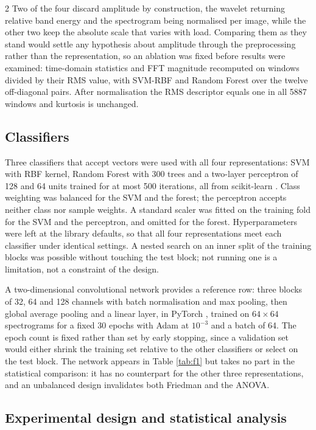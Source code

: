 \documentclass[12pt,twoside,titlepage]{ingenius}
\begin{document}
\begin{multicols}{2}
Two of the four discard amplitude by construction, the wavelet returning
relative band energy and the spectrogram being normalised per image, while the
other two keep the absolute scale that varies with load. Comparing them as they
stand would settle any hypothesis about amplitude through the preprocessing
rather than the representation, so an ablation was fixed before results were
examined: time-domain statistics and FFT magnitude recomputed on windows divided
by their RMS value, with SVM-RBF and Random Forest over the twelve off-diagonal
pairs. After normalisation the RMS descriptor equals one in all 5887 windows and
kurtosis is unchanged.

\subsection{Classifiers}

Three classifiers that accept vectors were used with all four representations:
SVM with RBF kernel, Random Forest with 300 trees and a two-layer perceptron of
128 and 64 units trained for at most 500 iterations, all from scikit-learn
\cite{pedregosa2011}. Class weighting was balanced for the SVM and the forest;
the perceptron accepts neither class nor sample weights. A standard scaler was
fitted on the training fold for the SVM and the perceptron, and omitted for the
forest. Hyperparameters were left at the library defaults, so that all four
representations meet each classifier under identical settings. A nested search
on an inner split of the training blocks was possible without touching the test
block; not running one is a limitation, not a constraint of the design.

A two-dimensional convolutional network provides a reference row: three blocks
of 32, 64 and 128 channels with batch normalisation and max pooling, then global
average pooling and a linear layer, in PyTorch \cite{paszke2019}, trained on
$64\times64$ spectrograms for a fixed 30 epochs with Adam at $10^{-3}$ and a
batch of 64. The epoch count is fixed rather than set by early stopping, since a
validation set would either shrink the training set relative to the other
classifiers or select on the test block. The network appears in Table
\ref{tab:f1} but takes no part in the statistical comparison: it has no
counterpart for the other three representations, and an unbalanced design
invalidates both Friedman and the ANOVA.

\subsection{Experimental design and statistical analysis}


\end{multicols}
\end{document}
